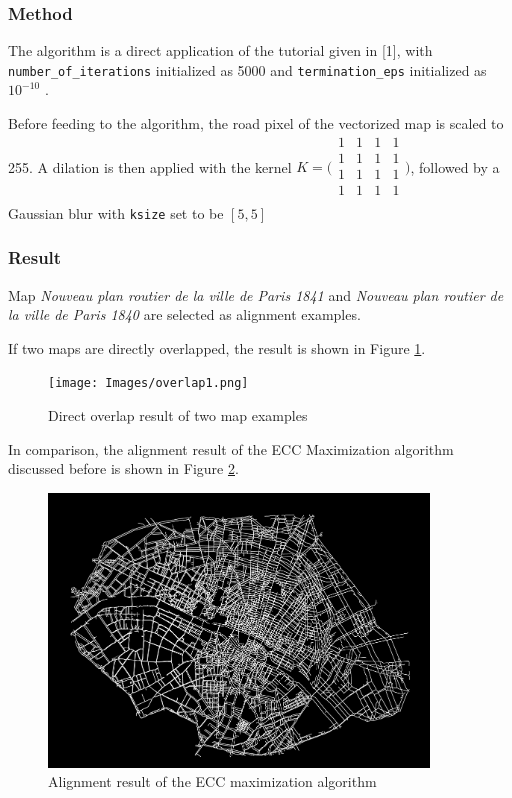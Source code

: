 \subsubsection{Method}
The algorithm is a direct application of the tutorial given in [1], with \texttt{\footnotesize number\_of\_iterations} initialized as 5000 and \texttt{\small termination\_eps} initialized as $10^{-10}$ \cite{mallick_2015_image}.

Before feeding to the algorithm, the road pixel of the vectorized map is scaled to 255. A dilation is then applied with the kernel
$K = \bigg(\begin{smallmatrix}
  1 & 1 & 1 & 1\\
  1 & 1 & 1 & 1\\
  1 & 1 & 1 & 1\\
  1 & 1 & 1 & 1\\
\end{smallmatrix}\bigg)$,
followed by a Gaussian blur with \texttt{\small ksize} \cite{opencv_library} set to be $[5, 5]$

\subsubsection{Result} \label{ecc_result}

Map \textit{Nouveau plan routier de la ville de Paris 1841} and \textit{Nouveau plan routier de la ville de Paris 1840} are selected as alignment examples.

If two maps are directly overlapped, the result is shown in Figure \ref{geo}.

\begin{figure}[h!]
\centering
\texttt{[image: Images/overlap1.png]}
\caption{Direct overlap result of two map examples}
\label{geo}
\end{figure}

In comparison, the alignment result of the ECC Maximization algorithm discussed before is shown in Figure \ref{ecc}. 

\begin{figure}[h!]
\centering
\includegraphics[width=0.9\textwidth]{Images/ECC_old.png}
\caption{Alignment result of the ECC maximization algorithm}
\label{ecc}
\end{figure}

